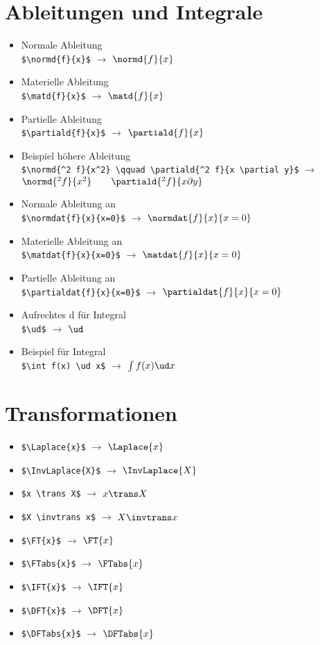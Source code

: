\section*{Ableitungen und Integrale}
\begin{itemize}
	\item Normale Ableitung\\ \verb|$\normd{f}{x}$| $\rightarrow$ $\normd{f}{x}$
	\item Materielle Ableitung\\ \verb|$\matd{f}{x}$| $\rightarrow$ $\matd{f}{x}$
	\item Partielle Ableitung\\ \verb|$\partiald{f}{x}$| $\rightarrow$ $\partiald{f}{x}$
	\item Beispiel höhere Ableitung\\ \verb|$\normd{^2 f}{x^2} \qquad \partiald{^2 f}{x \partial y}$| $\rightarrow$ $\normd{^2 f}{x^2} \qquad \partiald{^2 f}{x \partial y}$
	\item Normale Ableitung an\\ \verb|$\normdat{f}{x}{x=0}$| $\rightarrow$ $\normdat{f}{x}{x=0}$
	\item Materielle Ableitung an\\ \verb|$\matdat{f}{x}{x=0}$| $\rightarrow$ $\matdat{f}{x}{x=0}$
	\item Partielle Ableitung an\\ \verb|$\partialdat{f}{x}{x=0}$| $\rightarrow$ $\partialdat{f}{x}{x=0}$
	\item Aufrechtes \glqq{}d\grqq{} für Integral\\ \verb|$\ud$| $\rightarrow$ $\ud$
	\item Beispiel für Integral\\ \verb|$\int f(x) \ud x$| $\rightarrow$ $\int f(x) \ud x$
\end{itemize}


\section*{Transformationen}
\begin{itemize}
	\item \verb|$\Laplace{x}$| $\rightarrow$ $\Laplace{x}$
	\item \verb|$\InvLaplace{X}$| $\rightarrow$ $\InvLaplace{X}$
	\item \verb|$x \trans X$| $\rightarrow$ $x \trans X$
	\item \verb|$X \invtrans x$| $\rightarrow$ $X \invtrans x$
	\item \verb|$\FT{x}$| $\rightarrow$ $\FT{x}$
	\item \verb|$\FTabs{x}$| $\rightarrow$ $\FTabs{x}$
	\item \verb|$\IFT{x}$| $\rightarrow$ $\IFT{x}$
	\item \verb|$\DFT{x}$| $\rightarrow$ $\DFT{x}$
	\item \verb|$\DFTabs{x}$| $\rightarrow$ $\DFTabs{x}$
\end{itemize}



